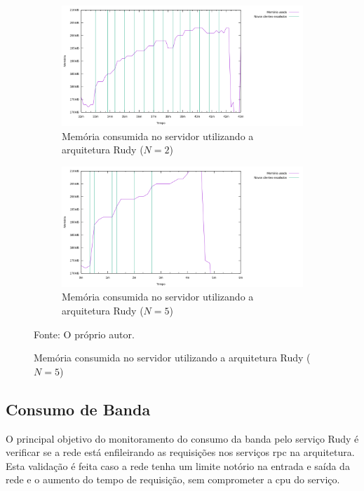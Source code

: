 \begin{figure}[htb!]
    \caption{Memória consumida no servidor utilizando a arquitetura Rudy ($N=2$ e $N=5$)}
    \centering
    \begin{subfigure}{1.0\textwidth}
      \centering
      \includegraphics[width=.9\textwidth]{metricas_rudy_t5/memory_used.png}
      \caption{Memória consumida no servidor utilizando a arquitetura Rudy ($N=2$)}
      \label{fig:rudy_t5_memory_used}
    \end{subfigure}


    \begin{subfigure}{1.0\textwidth}
      \centering
      \includegraphics[width=.9\textwidth]{metricas_rudy_t6/memory_used.png}
      \caption{Memória consumida no servidor utilizando a arquitetura Rudy ($N=5$)}
      \label{fig:rudy_t6_memory_used}
    \end{subfigure}
    \label{fig:rudy_t56_memory_used}

    Fonte: O próprio autor.
\end{figure}

\subsection{Consumo de Banda}

O principal objetivo do monitoramento do consumo da banda pelo serviço Rudy é verificar se a rede está enfileirando as requisições nos serviços \ac{rpc} na arquitetura.
%
Esta validação é feita caso a rede tenha um limite notório na entrada e saída da rede e o aumento do tempo de requisição, sem comprometer a \ac{cpu} do serviço.

